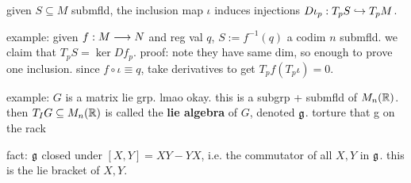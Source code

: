 given $S\subseteq M$ submfld, the inclusion map $\iota$ induces injections
$D\iota_{p}:T_{p}S\hookrightarrow T_{p}M$.

example: given $f:M\longrightarrow N$ and reg val $q$, $S:=f^{-1}(q)$ a codim $n$ submfld.
we claim that $T_{p}S=\ker Df_{p}$.
proof: note they have same dim, so enough to prove one inclusion.
since $f\circ\iota\equiv q$, take derivatives to get $T_{p}f(T_{p}\iota)=0$.

example: $G$ is a matrix lie grp. lmao okay. this is a subgrp + submfld of $M_{n}(\mathbb{R})$.
then $T_{I}G\subseteq M_{n}(\mathbb{R})$ is called the \textbf{lie algebra} of $G$, denoted $\mathfrak{g}$.
torture that g on the rack

fact: $\mathfrak{g}$ closed under $[X,Y]=XY-YX$, i.e. the commutator of all $X,Y$ in $\mathfrak{g}$.
this is the lie bracket of $X,Y$.
